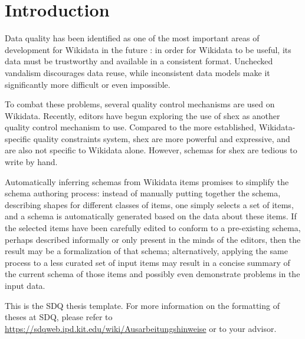 
\chapter{Introduction}
\label{ch:Introduction}

Data quality has been identified as one of the most important areas of development for Wikidata in the future \cite{wdcon2017-sotp}: %
in order for Wikidata to be useful,
its data must be trustworthy and available in a consistent format.
Unchecked vandalism discourages data reuse,
while inconsistent data models make it significantly more difficult or even impossible.

To combat these problems,
several quality control mechanisms are used on Wikidata.
Recently, editors have begun exploring the use of \acrlong{shex}
as another quality control mechanism to use.
Compared to the more established, Wikidata-specific quality constraints system,
\acrlong{shex} are more powerful and expressive,
and are also not specific to Wikidata alone.
However, schemas for \acrlong{shex} are tedious to write by hand.

Automatically inferring schemas from Wikidata items
promises to simplify the schema authoring process:
instead of manually putting together the schema,
describing shapes for different classes of items,
one simply selects a set of items,
and a schema is automatically generated based on the data about these items.
If the selected items have been carefully edited
to conform to a pre-existing schema,
perhaps described informally or only present in the minds of the editors,
then the result may be a formalization of that schema;
alternatively, applying the same process to a less curated set of input items
may result in a concise summary of the current schema of those items %
and possibly even demonstrate problems in the input data.



This is the SDQ thesis template.
For more information on the formatting of theses at SDQ, please refer to
\url{https://sdqweb.ipd.kit.edu/wiki/Ausarbeitungshinweise} or to your advisor.

